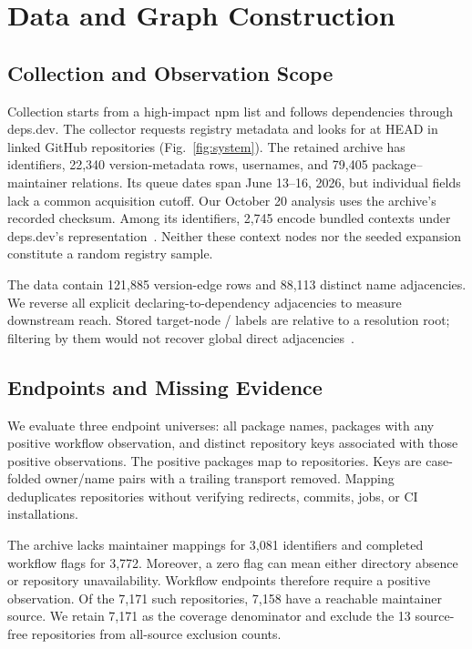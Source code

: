\section{Data and Graph Construction}
\subsection{Collection and Observation Scope}
Collection starts from a high-impact npm list and follows dependencies through deps.dev. The collector requests registry metadata and looks for  at HEAD in linked GitHub repositories (Fig.~\ref{fig:system}). The retained archive has \StudyPackages{} identifiers, 22,340 version-metadata rows, \StudyMaintainers{} usernames, and 79,405 package--maintainer relations. Its queue dates span June 13--16, 2026, but individual fields lack a common acquisition cutoff. Our October 20 analysis uses the archive's recorded checksum. Among its identifiers, 2,745 encode bundled contexts under deps.dev's representation~\cite{depsdev}. Neither these context nodes nor the seeded expansion constitute a random registry sample.

The data contain 121,885 version-edge rows and 88,113 distinct name adjacencies. We reverse all explicit declaring-to-dependency adjacencies to measure downstream reach. Stored target-node / labels are relative to a resolution root; filtering by them would not recover global direct adjacencies~\cite{depsdev}.

\subsection{Endpoints and Missing Evidence}
We evaluate three endpoint universes: all package names, packages with any positive workflow observation, and distinct repository keys associated with those positive observations. The \StudyWorkflowPackages{} positive packages map to \StudyWorkflowRepos{} repositories. Keys are case-folded owner/name pairs with a trailing transport  removed. Mapping deduplicates repositories without verifying redirects, commits, jobs, or CI installations.

The archive lacks maintainer mappings for 3,081 identifiers and completed workflow flags for 3,772. Moreover, a zero flag can mean either directory absence or repository unavailability. Workflow endpoints therefore require a positive observation. Of the 7,171 such repositories, 7,158 have a reachable maintainer source. We retain 7,171 as the coverage denominator and exclude the 13 source-free repositories from all-source exclusion counts.

